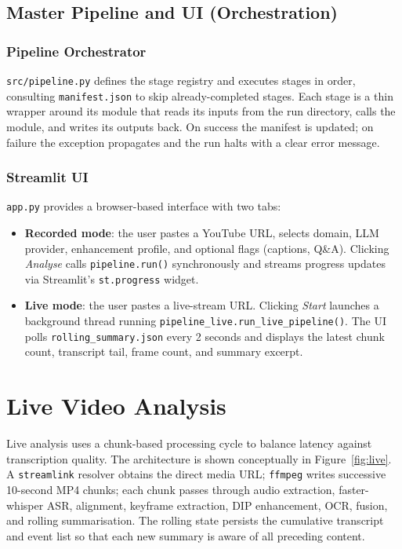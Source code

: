\documentclass[12pt,a4paper]{article}
\begin{document}
\subsection{Master Pipeline and UI (Orchestration)}
\label{subsec:pipeline}

\subsubsection{Pipeline Orchestrator}
\texttt{src/pipeline.py} defines the stage registry and executes stages in order,
consulting \texttt{manifest.json} to skip already-completed stages. Each stage is
a thin wrapper around its module that reads its inputs from the run directory, calls the
module, and writes its outputs back. On success the manifest is updated; on failure the
exception propagates and the run halts with a clear error message.

\subsubsection{Streamlit UI}
\texttt{app.py} provides a browser-based interface with two tabs:
\begin{itemize}[leftmargin=*]
  \item \textbf{Recorded mode}: the user pastes a YouTube URL, selects domain, LLM
    provider, enhancement profile, and optional flags (captions, Q\&A). Clicking
    \textit{Analyse} calls \texttt{pipeline.run()} synchronously and streams progress
    updates via Streamlit's \texttt{st.progress} widget.
  \item \textbf{Live mode}: the user pastes a live-stream URL. Clicking \textit{Start}
    launches a background thread running \texttt{pipeline\_live.run\_live\_pipeline()}.
    The UI polls \texttt{rolling\_summary.json} every 2 seconds and displays the latest
    chunk count, transcript tail, frame count, and summary excerpt.
\end{itemize}

\section{Live Video Analysis}
\label{sec:live}

Live analysis uses a chunk-based processing cycle to balance latency against
transcription quality. The architecture is shown conceptually in
Figure~\ref{fig:live}. A \texttt{streamlink} resolver obtains the direct media
URL; \texttt{ffmpeg} writes successive 10-second MP4 chunks; each chunk passes
through audio extraction, faster-whisper ASR, alignment, keyframe extraction,
DIP enhancement, OCR, fusion, and rolling summarisation. The rolling state persists
the cumulative transcript and event list so that each new summary is aware of all
preceding content.
\end{document}
